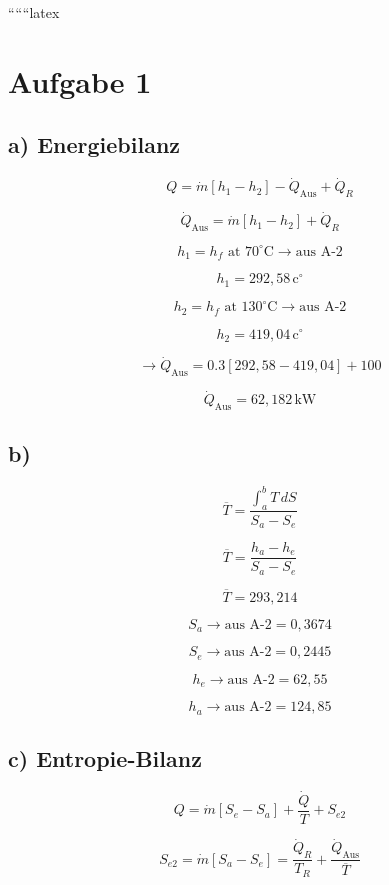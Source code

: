 
``````latex


\section*{Aufgabe 1}

\subsection*{a) Energiebilanz}

\[
Q = \dot{m} [h_1 - h_2] - \dot{Q}_{\text{Aus}} + \dot{Q}_R
\]

\[
\dot{Q}_{\text{Aus}} = \dot{m} [h_1 - h_2] + \dot{Q}_R
\]

\[
h_1 = h_f \text{ at } 70^\circ \text{C} \rightarrow \text{aus A-2}
\]

\[
h_1 = 292,58 \, \text{c}^\circ
\]

\[
h_2 = h_f \text{ at } 130^\circ \text{C} \rightarrow \text{aus A-2}
\]

\[
h_2 = 419,04 \, \text{c}^\circ
\]

\[
\rightarrow \dot{Q}_{\text{Aus}} = 0.3 [292,58 - 419,04] + 100
\]

\[
\dot{Q}_{\text{Aus}} = 62,182 \, \text{kW}
\]

\subsection*{b)}

\[
\overline{T} = \frac{\int_{a}^{b} T \, dS}{S_a - S_e}
\]

\[
\overline{T} = \frac{h_a - h_e}{S_a - S_e}
\]

\[
\overline{T} = 293,214
\]

\[
S_a \rightarrow \text{aus A-2} = 0,3674
\]

\[
S_e \rightarrow \text{aus A-2} = 0,2445
\]

\[
h_e \rightarrow \text{aus A-2} = 62,55
\]

\[
h_a \rightarrow \text{aus A-2} = 124,85
\]

\subsection*{c) Entropie-Bilanz}

\[
Q = \dot{m} [S_e - S_a] + \frac{\dot{Q}}{T} + S_{e2}
\]

\[
S_{e2} = \dot{m} [S_a - S_e] = \frac{\dot{Q}_R}{T_R} + \frac{\dot{Q}_{\text{Aus}}}{\overline{T}}
\]

